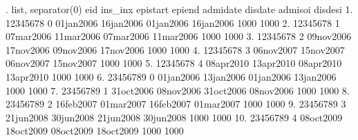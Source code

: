 . list, separator(0)
{\smallskip}
     {\TLC}
     {\VBAR}      eid   ins_in{\tytilde}x    epistart      epiend    admidate     disdate   admiso{\tytilde}i   disdes{\tytilde}i {\VBAR}
     {\LFTT}
  1. {\VBAR} 12345678          0   01jan2006   16jan2006   01jan2006   16jan2006       1000       1000 {\VBAR}
  2. {\VBAR} 12345678          1   07mar2006   11mar2006   07mar2006   11mar2006       1000       1000 {\VBAR}
  3. {\VBAR} 12345678          2   09nov2006   17nov2006   09nov2006   17nov2006       1000       1000 {\VBAR}
  4. {\VBAR} 12345678          3   06nov2007   15nov2007   06nov2007   15nov2007       1000       1000 {\VBAR}
  5. {\VBAR} 12345678          4   08apr2010   13apr2010   08apr2010   13apr2010       1000       1000 {\VBAR}
  6. {\VBAR} 23456789          0   01jan2006   13jan2006   01jan2006   13jan2006       1000       1000 {\VBAR}
  7. {\VBAR} 23456789          1   31oct2006   08nov2006   31oct2006   08nov2006       1000       1000 {\VBAR}
  8. {\VBAR} 23456789          2   16feb2007   01mar2007   16feb2007   01mar2007       1000       1000 {\VBAR}
  9. {\VBAR} 23456789          3   21jun2008   30jun2008   21jun2008   30jun2008       1000       1000 {\VBAR}
 10. {\VBAR} 23456789          4   08oct2009   18oct2009   08oct2009   18oct2009       1000       1000 {\VBAR}
     {\BLC}
{\smallskip}
